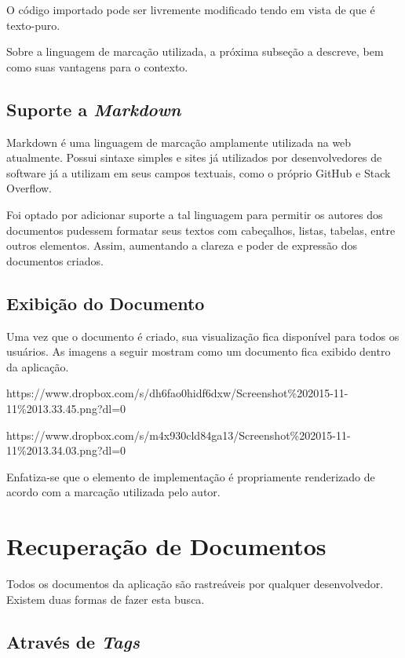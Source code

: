 O código importado pode ser livremente modificado tendo em vista de que é texto-puro.


Sobre a linguagem de marcação utilizada, a próxima subseção a descreve, bem como suas vantagens para o contexto.

\subsection{Suporte a \textit{Markdown}}

Markdown é uma linguagem de marcação amplamente utilizada na web atualmente. Possui sintaxe simples e sites já utilizados por desenvolvedores de software já a utilizam em seus campos textuais, como o próprio GitHub e Stack Overflow.

Foi optado por adicionar suporte a tal linguagem para permitir os autores dos documentos pudessem formatar seus textos com cabeçalhos, listas, tabelas, entre outros elementos. Assim, aumentando a clareza e poder de expressão dos documentos criados.

\subsection{Exibição do Documento}

Uma vez que o documento é criado, sua visualização fica disponível para todos os usuários. As imagens a seguir mostram como um documento fica exibido dentro da aplicação.

https://www.dropbox.com/s/dh6fao0hidf6dxw/Screenshot\%202015-11-11\%2013.33.45.png?dl=0

https://www.dropbox.com/s/m4x930cld84ga13/Screenshot\%202015-11-11\%2013.34.03.png?dl=0

Enfatiza-se que o elemento de implementação é propriamente renderizado de acordo com a marcação utilizada pelo autor.

\section{Recuperação de Documentos}

Todos os documentos da aplicação são rastreáveis por qualquer desenvolvedor. Existem duas formas de fazer esta busca.

\subsection{Através de \textit{Tags}}

